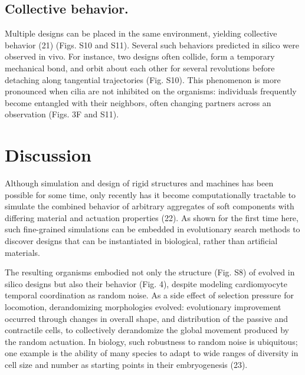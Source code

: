 \subsection*{Collective behavior.}  

Multiple designs can be placed in the same environment, yielding collective behavior (21) (Figs. S10 and S11). Several such behaviors predicted in silico were observed in vivo. For instance, two designs often collide, form a temporary mechanical bond, and orbit about each other for several revolutions before detaching along tangential trajectories (Fig. S10). This phenomenon is more pronounced when cilia are not inhibited on the organisms: individuals frequently become entangled with their neighbors, often changing partners across an observation (Figs. 3F and S11).

\section{Discussion}

Although simulation and design of rigid structures and machines has been possible for some time, only recently has it become computationally tractable to simulate the combined behavior of arbitrary aggregates of soft components with differing material and actuation properties (22). As shown for the first time here, such fine-grained simulations can be embedded in evolutionary search methods to discover designs that can be instantiated in biological, rather than artificial materials. 

The resulting organisms embodied not only the structure (Fig. S8) of evolved in silico designs but also their behavior (Fig. 4), despite modeling cardiomyocyte temporal coordination as random noise. As a side effect of selection pressure for locomotion, derandomizing morphologies evolved: evolutionary improvement occurred through changes in overall shape, and distribution of the passive and contractile cells, to collectively derandomize the global movement produced by the random actuation. In biology, such robustness to random noise is ubiquitous; one example is the ability of many species to adapt to wide ranges of diversity in cell size and number as starting points in their embryogenesis (23).

